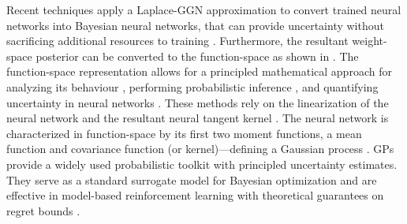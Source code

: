 \documentclass{article}
\makeatletter
\newcommand{\eg}{\textit{e.g.\@}\xspace}
\newcommand{\our}{\textsc{sfr}\xspace}
\makeatother
\begin{document}
\begin{figure}[t!]
  \vspace*{-1em}
\end{figure}


Recent techniques  \citep[\eg,][]{ritter2018kfac,khan2019approximate,daxberger2021laplace,fortuin2021bayesian,immer2021scalable} apply a Laplace-GGN approximation to convert trained neural networks into Bayesian neural networks, that can provide uncertainty without sacrificing additional resources to training \citep{foong2019between}. Furthermore, the resultant weight-space posterior can be converted to the function-space as shown in \citet{khan2019approximate, immer2021improving}. The function-space representation allows for a principled mathematical approach for analyzing its behaviour \citep{cho2009kernel,meronen2020stationary}, performing probabilistic inference \citep{khan2019approximate}, and quantifying uncertainty in neural networks \citep{foong2019between}. These methods rely on the linearization of the neural network and the resultant neural tangent kernel \citep[NTK,][]{jacot2018neural}. The neural network is characterized in function-space by its first two moment functions, a mean function and covariance function (or kernel)---defining a Gaussian process \citep[GP,][]{rasmussen2006gaussian}. GPs provide a widely used probabilistic toolkit with principled uncertainty estimates. They serve as a standard surrogate model for Bayesian optimization \citep{garnett_bayesoptbook_2022} and are effective in model-based reinforcement learning \citep{deisenroth2011pilco} with theoretical guarantees on regret bounds \citep{srinivas2009gaussian}.
\end{document}
